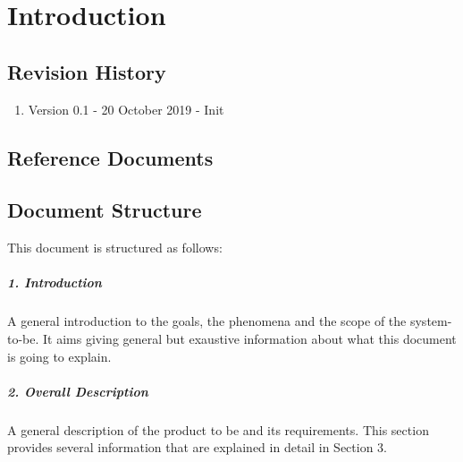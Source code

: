 \documentclass[../rasd.tex]{subfiles}
\begin{document}
\chapter{Introduction}
\thispagestyle{fancy}
		
		
		
		
	
		\section{Revision History}
		\begin{enumerate}
			\item Version 0.1 - 20 October 2019 - Init

		\end{enumerate}
		\section{Reference Documents}
		\section{Document Structure}
		This document is structured as follows:
		\paragraph{1. Introduction}
		A general introduction to the goals, the phenomena and the scope of the system-to-be. It aims giving general but exaustive information about what this document is going to explain.
		\paragraph{2. Overall Description}
		A general description of the product to be and its requirements. This section provides several information that are explained in detail in Section 3.
\end{document}
